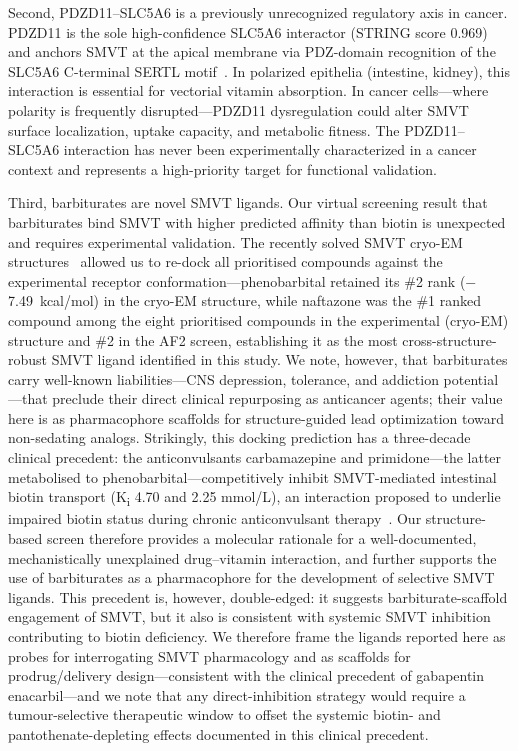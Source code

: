 \documentclass[pdflatex,sn-nature]{sn-jnl}
\begin{document}
\noindent Second, PDZD11--SLC5A6 is a previously unrecognized regulatory axis in cancer. PDZD11 is the sole high-confidence SLC5A6 interactor (STRING score 0.969) and anchors SMVT at the apical membrane via PDZ-domain recognition of the SLC5A6 C-terminal SERTL motif~\cite{nabokina2011}. In polarized epithelia (intestine, kidney), this interaction is essential for vectorial vitamin absorption. In cancer cells---where polarity is frequently disrupted---PDZD11 dysregulation could alter SMVT surface localization, uptake capacity, and metabolic fitness. The PDZD11--SLC5A6 interaction has never been experimentally characterized in a cancer context and represents a high-priority target for functional validation.

\noindent Third, barbiturates are novel SMVT ligands. Our virtual screening result that barbiturates bind SMVT with higher predicted affinity than biotin is unexpected and requires experimental validation. The recently solved SMVT cryo-EM structures~\cite{zhen2026} allowed us to re-dock all prioritised compounds against the experimental receptor conformation---phenobarbital retained its \#2 rank ($-$7.49~kcal/mol) in the cryo-EM structure, while naftazone was the \#1 ranked compound among the eight prioritised compounds in the experimental (cryo-EM) structure and \#2 in the AF2 screen, establishing it as the most cross-structure-robust SMVT ligand identified in this study. We note, however, that barbiturates carry well-known liabilities---CNS depression, tolerance, and addiction potential---that preclude their direct clinical repurposing as anticancer agents; their value here is as pharmacophore scaffolds for structure-guided lead optimization toward non-sedating analogs. Strikingly, this docking prediction has a three-decade clinical precedent: the anticonvulsants carbamazepine and primidone---the latter metabolised to phenobarbital---competitively inhibit SMVT-mediated intestinal biotin transport (K\textsubscript{i} 4.70 and 2.25 mmol/L), an interaction proposed to underlie impaired biotin status during chronic anticonvulsant therapy~\cite{said1989}. Our structure-based screen therefore provides a molecular rationale for a well-documented, mechanistically unexplained drug--vitamin interaction, and further supports the use of barbiturates as a pharmacophore for the development of selective SMVT ligands. This precedent is, however, double-edged: it suggests barbiturate-scaffold engagement of SMVT, but it also is consistent with systemic SMVT inhibition contributing to biotin deficiency. We therefore frame the ligands reported here as probes for interrogating SMVT pharmacology and as scaffolds for prodrug/delivery design---consistent with the clinical precedent of gabapentin enacarbil---and we note that any direct-inhibition strategy would require a tumour-selective therapeutic window to offset the systemic biotin- and pantothenate-depleting effects documented in this clinical precedent.
\end{document}
